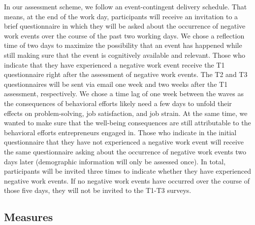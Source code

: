 \documentclass[man, 12pt, a4paper, noextraspace]{apa6}
\begin{document}
In our assessment scheme, we follow an event-contingent delivery schedule. 
That means, at the end of the work day, participants will receive an invitation to a brief questionnaire in which they will be asked about the occurrence of negative work events over the course of the past two working days. 
We chose a reflection time of two days to maximize the possibility that an event has happened while still making sure that the event is cognitively available and relevant.
Those who indicate that they have experienced a negative work event receive the T1 questionnaire right after the assessment of negative work events. 
The T2 and T3 questionnaires will be sent via email one week and two weeks after the T1 assessment, respectively. 
We chose a time lag of one week between the waves as the consequences of behavioral efforts likely need a few days to unfold their effects on problem-solving, job satisfaction, and job strain. 
At the same time, we wanted to make sure that the well-being consequences are still attributable to the behavioral efforts entrepreneurs engaged in. 
Those who indicate in the initial questionnaire that they have not experienced a negative work event will receive the same questionnaire asking about the occurrence of negative work events two days later (demographic information will only be assessed once).
In total, participants will be invited three times to indicate whether they have experienced negative work events. 
If no negative work events have occurred over the course of those five days, they will not be invited to the T1-T3 surveys. \par 

\subsection{Measures}
\end{document}
